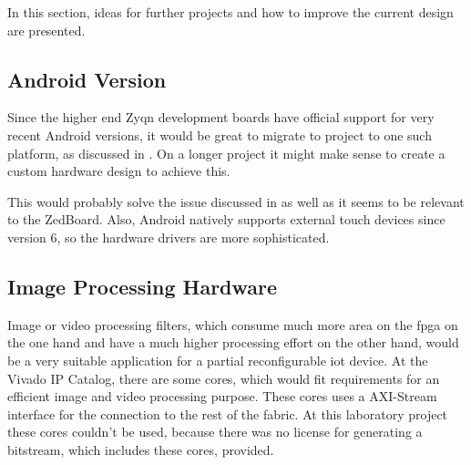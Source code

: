 In this section, ideas for further projects and how to improve the current
design are presented.
\subsection{Android Version}
Since the higher end Zyqn development boards have official support for very
recent Android versions, it would be great to migrate to project to one such
platform, as discussed in .
On a longer project it might make sense to create a custom hardware design to
achieve this.

This would probably solve the issue discussed in  as
well as it seems to be relevant to the ZedBoard.
Also, Android natively supports external touch devices since version 6, so the
hardware drivers are more sophisticated.

\subsection{Image Processing Hardware}
Image or video processing filters, which consume much more area on the \gls{fpga} on the one hand and have a much higher processing effort on the other hand, would be a very suitable application for a partial reconfigurable \gls{iot} device. At the Vivado IP Catalog, there are some cores, which would fit requirements for an efficient image and video processing purpose. These cores uses a AXI-Stream interface for the connection to the rest of the fabric. At this laboratory project these cores couldn't be used, because there was no license for generating a bitstream, which includes these cores, provided.
